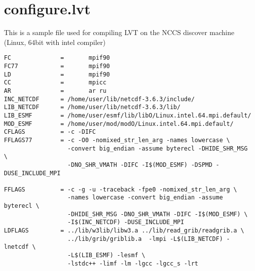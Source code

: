 
\section{configure.lvt} \label{sec:configure.lvt}
This is a sample  file used for compiling LVT on the NCCS
discover machine (Linux, 64bit with intel compiler)

\begin{verbatim}
FC              =       mpif90
FC77            =       mpif90
LD              =       mpif90
CC              =       mpicc
AR              =       ar ru
INC_NETCDF      = /home/user/lib/netcdf-3.6.3/include/
LIB_NETCDF      = /home/user/lib/netcdf-3.6.3/lib/
LIB_ESMF        = /home/user/esmf/lib/libO/Linux.intel.64.mpi.default/
MOD_ESMF        = /home/user/mod/modO/Linux.intel.64.mpi.default/
CFLAGS          = -c -DIFC
FFLAGS77        = -c -O0 -nomixed_str_len_arg -names lowercase \
                  -convert big_endian -assume byterecl -DHIDE_SHR_MSG \
                  -DNO_SHR_VMATH -DIFC -I$(MOD_ESMF) -DSPMD -DUSE_INCLUDE_MPI

FFLAGS          = -c -g -u -traceback -fpe0 -nomixed_str_len_arg \
                  -names lowercase -convert big_endian -assume byterecl \
                  -DHIDE_SHR_MSG -DNO_SHR_VMATH -DIFC -I$(MOD_ESMF) \
                  -I$(INC_NETCDF) -DUSE_INCLUDE_MPI
LDFLAGS         = ../lib/w3lib/libw3.a ../lib/read_grib/readgrib.a \
                  ../lib/grib/griblib.a  -lmpi -L$(LIB_NETCDF) -lnetcdf \
                  -L$(LIB_ESMF) -lesmf \
                  -lstdc++ -limf -lm -lgcc -lgcc_s -lrt 
\end{verbatim}
